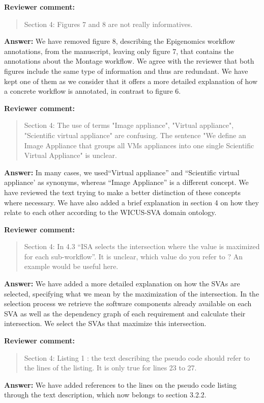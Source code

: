 \documentclass{letter}
\newenvironment{review}%
{\textbf{Reviewer comment:}\begin{quote}}%
{\end{quote}}%
\newcommand{\answer}[1]{%
      \textbf{Answer:} #1}
\begin{document}
\begin{letter}{}
\begin{review}
Section 4: Figures 7 and 8 are not really informatives.
\end{review}

\answer{We have removed figure 8, describing the Epigenomics workflow annotations, from the manuscript, leaving only figure 7, that contains the annotations about the Montage workflow. We agree with the reviewer that both figures include the same type of information and thus are redundant. We have kept one of them as we consider that it offers a more detailed explanation of how a concrete workflow is annotated, in contrast to figure 6.}


\begin{review}
Section 4: The use of terms "Image appliance", "Virtual appliance", "Scientific virtual appliance" are confusing. The sentence "We define an Image Appliance that groups all VMs appliances into one single Scientific Virtual Appliance" is unclear.
\end{review}

\answer{In many cases, we used``Virtual appliance'' and ``Scientific virtual appliance' as synonyms, whereas ``Image Appliance'' is a different concept. We have reviewed the text trying to make a better distinction of these concepts where necessary. We have also added a brief explanation in section 4 on how they relate to each other according to the WICUS-SVA domain ontology.}

\begin{review}
Section 4: In 4.3 ``ISA selects the intersection where the value is maximized for each sub-workflow''. It is unclear, which value do you refer to ? An example would be useful here.
\end{review}

\answer{We have added a more detailed explanation on how the SVAs are selected, specifying what we mean by the maximization of the intersection. In the selection process we retrieve the software components already available on each SVA as well as the dependency graph of each requirement and calculate their intersection. We select the SVAs that maximize this intersection.}


\begin{review}
Section 4: Listing 1 : the text describing the pseudo code should refer to the lines of the listing. It is only true for lines 23 to 27.
\end{review}

\answer{We have added references to the lines on the pseudo code listing through the text description, which now belongs to section 3.2.2.}



\end{letter}
\end{document}
